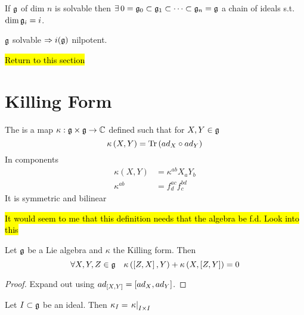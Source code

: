 \documentclass{article}
\begin{document}
\begin{corollary}
	If $\mf{g}$ of dim $n$ is solvable then $\exists \,  0 = \mf{g}_0 \subset \mf{g}_1 \subset \dots \subset \mf{g}_n=\mf{g}$ a chain of ideals s.t. $\dim \mf{g}_i = i$. 
\end{corollary}

\begin{corollary}
	$\mf{g}$ solvable $\Rightarrow i(\mf{g})$ nilpotent. 
\end{corollary}

\hl{Return to this section}

\section{Killing Form}
\begin{definition}
	The  is a map $\kappa:\mf{g}\times\mf{g}\to\mbb{C}$ defined such that for $X,Y\in\mf{g}$
	\[
	\kappa\left(X,Y\right)=\tr\left(ad_X \circ ad_Y\right)
	\]
	In components 
	\begin{align*}
	\kappa(X,Y) &= \kappa^{ab}X_a Y_b \\
	\kappa^{ab} &= f^{ac}_d f^{bd}_c
	\end{align*}
	It is symmetric and bilinear 
\end{definition}

\begin{remark}
	\hl{It would seem to me that this definition needs that the algebra be f.d. Look into this}
\end{remark}

\begin{theorem}
	Let $\mf{g}$ be a Lie algebra and $\kappa$ the Killing form. Then
	\[
	\forall X,Y,Z\in\mf{g} \quad \kappa\left(\comm[Z]{X},Y\right)+\kappa\left(X,\comm[Z]{Y}\right)=0
	\]
\end{theorem}
\begin{proof}
	Expand out using $ad_{\comm[X]{Y}} = \comm[ad_X]{ad_Y}$. 
\end{proof}

\begin{lemma}
	Let $I \subset \mf{g}$ be an ideal. Then $\kappa_I = \ev{\kappa}{I \times I}$
\end{lemma}
\end{document}
